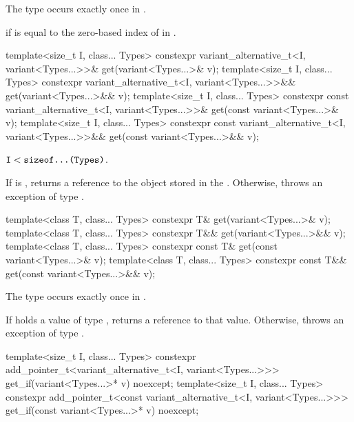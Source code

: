 \begin{itemdescr}
\pnum
\mandates
The type  occurs exactly once in .

\pnum
\returns
{} if  is equal to the zero-based index of  in .
\end{itemdescr}

%
\begin{itemdecl}
template<size_t I, class... Types>
  constexpr variant_alternative_t<I, variant<Types...>>& get(variant<Types...>& v);
template<size_t I, class... Types>
  constexpr variant_alternative_t<I, variant<Types...>>&& get(variant<Types...>&& v);
template<size_t I, class... Types>
  constexpr const variant_alternative_t<I, variant<Types...>>& get(const variant<Types...>& v);
template<size_t I, class... Types>
  constexpr const variant_alternative_t<I, variant<Types...>>&& get(const variant<Types...>&& v);
\end{itemdecl}

\begin{itemdescr}
\pnum
\mandates
$\texttt{I} < \texttt{sizeof...(Types)}$.

\pnum
\effects
If  is , returns a reference to the object stored in
the . Otherwise, throws an exception of type .
\end{itemdescr}

%
\begin{itemdecl}
template<class T, class... Types> constexpr T& get(variant<Types...>& v);
template<class T, class... Types> constexpr T&& get(variant<Types...>&& v);
template<class T, class... Types> constexpr const T& get(const variant<Types...>& v);
template<class T, class... Types> constexpr const T&& get(const variant<Types...>&& v);
\end{itemdecl}

\begin{itemdescr}
\pnum
\mandates
The type  occurs exactly once in .

\pnum
\effects
If  holds a value of type , returns a reference to that value.
Otherwise, throws an exception of type .
\end{itemdescr}

%
%
\begin{itemdecl}
template<size_t I, class... Types>
  constexpr add_pointer_t<variant_alternative_t<I, variant<Types...>>>
    get_if(variant<Types...>* v) noexcept;
template<size_t I, class... Types>
  constexpr add_pointer_t<const variant_alternative_t<I, variant<Types...>>>
    get_if(const variant<Types...>* v) noexcept;
\end{itemdecl}

